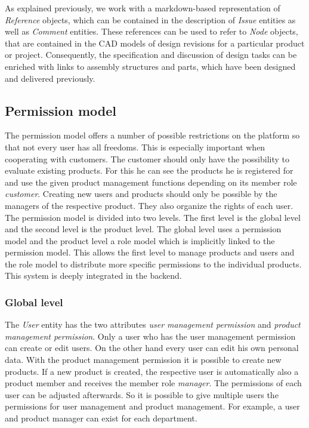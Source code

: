     As explained previously, we work with a markdown-based representation of \textit{Reference} objects, which can be contained in the description of \textit{Issue} entities as well as \textit{Comment} entities.
    These references can be used to refer to \textit{Node} objects, that are contained in the CAD models of design revisions for a particular product or project.
    Consequently, the specification and discussion of design tasks can be enriched with links to assembly structures and parts, which have been designed and delivered previously.

    \subsection*{Permission model}
    \label{subsec:permissionModel}
    The permission model offers a number of possible restrictions on the platform so that not every user has all freedoms. This is especially important when cooperating with customers. The customer should only have the possibility to evaluate existing products. For this he can see the products he is registered for and use the given product management functions depending on its member role \textit{customer}. Creating new users and products should only be possible by the managers of the respective product. They also organize the rights of each user. The permission model is divided into two levels. The first level is the global level and the second level is the product level. The global level uses a permission model and the product level a role model which is implicitly linked to the permission model. 
    This allows the first level to manage products and users and the role model to distribute more specific permissions to the individual products. This system is deeply integrated in the backend.

    \subsubsection*{Global level}
    The \textit{User} entity has the two attributes \textit{user management permission} and \textit{product management permission}. Only a user who has the user management permission can create or edit users. On the other hand every user can edit his own personal data. With the product management permission it is possible to create new products. If a new product is created, the respective user is automatically also a product member and receives the member role \textit{manager}. The permissions of each user can be adjusted afterwards. So it is possible to give multiple users the permissions for user management and product management. For example, a user and product manager can exist for each department. 

